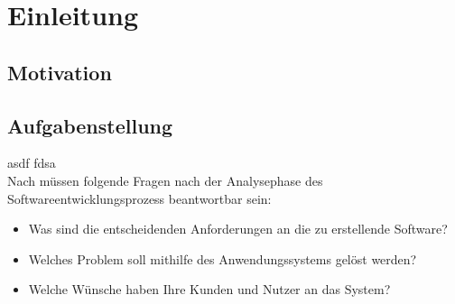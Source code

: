 \chapter{Einleitung}
\label{Einleitung}

	\section{Motivation}
	\label{Einleitung:Motivation}
	
	\section{Aufgabenstellung}
	\label{Einleitung:Aufgabenstellung}
	asdf fdsa\\
	Nach \cite[S. 169]{Krypczyk2018} müssen folgende Fragen nach der Analysephase des Softwareentwicklungsprozess beantwortbar sein:
	\begin{itemize}
		\item Was sind die entscheidenden Anforderungen an die zu erstellende Software?
		\item Welches Problem soll mithilfe des Anwendungssystems gelöst werden?
		\item Welche Wünsche haben Ihre Kunden und Nutzer an das System?
	\end{itemize}
	
